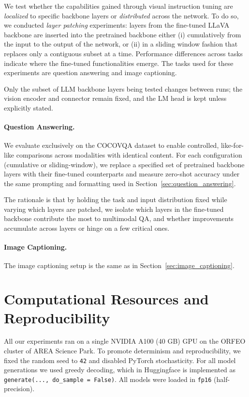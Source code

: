 We test whether the capabilities gained through visual instruction tuning are \emph{localized} to specific backbone layers or \emph{distributed} across the network. To do so, we conducted \emph{layer patching} experiments: layers from the fine-tuned LLaVA backbone are inserted into the pretrained backbone either (i) cumulatively from the input to the output of the network, or (ii) in a sliding window fashion that replaces only a contiguous subset at a time. Performance differences across tasks indicate where the fine-tuned functionalities emerge. The tasks used for these experiments are question answering and image captioning.

Only the subset of LLM backbone layers being tested changes between runs; the vision encoder and connector remain fixed, and the LM head is kept unless explicitly stated.

\paragraph{Question Answering.}
We evaluate exclusively on the COCOVQA dataset to enable controlled, like-for-like comparisons across modalities with identical content. For each configuration (cumulative or sliding-window), we replace a specified set of pretrained backbone layers with their fine-tuned counterparts and measure zero-shot accuracy under the same prompting and formatting used in Section~\ref{sec:question_answering}.

The rationale is that by holding the task and input distribution fixed while varying which layers are patched, we isolate which layers in the fine-tuned backbone contribute the most to multimodal QA, and whether improvements accumulate across layers or hinge on a few critical ones.

\paragraph{Image Captioning.}
The image captioning setup is the same as in Section~\ref{sec:image_captioning}.

\section{Computational Resources and Reproducibility}

All our experiments ran on a single NVIDIA A100 (40 GB) GPU on the ORFEO cluster of AREA Science Park. To promote determinism and reproducibility, we fixed the random seed to \texttt{42} and disabled PyTorch stochasticity. For all model generations we used greedy decoding, which in Huggingface is implemented as \texttt{generate(..., do\_sample = False)}. All models were loaded in \texttt{fp16} (half-precision).